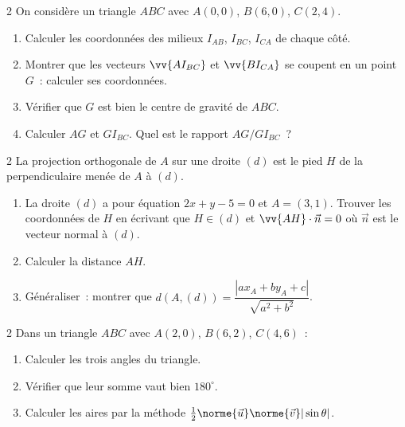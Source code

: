 \begin{exo}{2}
On consid\`ere un triangle $ABC$ avec $A(0,0)$, $B(6,0)$, $C(2,4)$.
\begin{enumerate}
  \item Calculer les coordonn\'ees des milieux $I_{AB}$, $I_{BC}$, $I_{CA}$
        de chaque c\^ot\'e.
  \item Montrer que les vecteurs $\vv{AI_{BC}}$ et $\vv{BI_{CA}}$
        se coupent en un point $G$~: calculer ses coordonn\'ees.
  \item V\'erifier que $G$ est bien le centre de gravité de $ABC$.
  \item Calculer $AG$ et $GI_{BC}$. Quel est le rapport $AG/GI_{BC}$~?
\end{enumerate}
\end{exo}

\begin{exo}{2}
La projection orthogonale de $A$ sur une droite $(d)$ est le pied $H$
de la perpendiculaire men\'ee de $A$ \`a $(d)$.
\begin{enumerate}
  \item La droite $(d)$ a pour \'equation $2x+y-5=0$ et $A=(3,1)$.
        Trouver les coordonn\'ees de $H$ en \'ecrivant que $H\in(d)$
        et $\vv{AH}\cdot\vec{n}=0$ o\`u $\vec{n}$ est le vecteur normal \`a $(d)$.
  \item Calculer la distance $AH$.
  \item G\'en\'eraliser~: montrer que $d(A,(d)) = \dfrac{|ax_A+by_A+c|}{\sqrt{a^2+b^2}}$.
\end{enumerate}
\end{exo}

\begin{exo}{2}
Dans un triangle $ABC$ avec $A(2,0)$, $B(6,2)$, $C(4,6)$~:
\begin{enumerate}
  \item Calculer les trois angles du triangle.
  \item V\'erifier que leur somme vaut bien $180^{\circ}$.
  \item Calculer les aires par la m\'ethode $\frac{1}{2}\norme{\vec{u}}\norme{\vec{v}}|\sin\theta|$.
\end{enumerate}
\end{exo}

